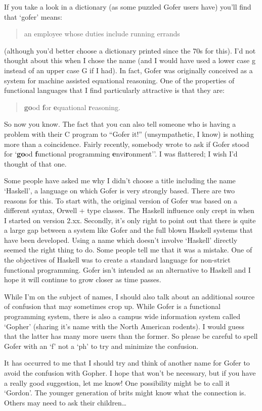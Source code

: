 If you take a look in a dictionary (as some puzzled Gofer users have)
you'll find that `gofer' means:
\begin{quote}
     an employee whose duties include running errands
\end{quote}
(although you'd better choose a dictionary printed since the 70s for
this).  I'd not thought about this when I chose the name (and I would
have used a lower case g instead of an upper case G if I had).  In
fact, Gofer was originally conceived as a system for machine assisted
equational reasoning.  One of the properties of functional languages
that I find particularly attractive is that they are:
\begin{quote}
    {\bf go}od {\bf f}or {\bf e}quational {\bf r}easoning.
\end{quote}
So now you know.  The fact that you can also tell someone who is having
a problem with their C program to ``Gofer it!'' (unsympathetic, I know)
is nothing more than a coincidence.  Fairly recently, somebody wrote to
ask if Gofer stood for 
`{\bf go}od {\bf f}unctional programming {\bf e}nvi{\bf r}onment''. I
was flattered; I wish I'd thought of that one.

Some people have asked me why I didn't choose a title including the
name `Haskell', a language on which Gofer is very strongly based.
There are two reasons for this.  To start with, the original version of
Gofer was based on a different syntax, Orwell + type classes.  The
Haskell influence only crept in when I started on version 2.xx.
Secondly, it's only right to point out that there is quite a large gap
between a system like Gofer and the full blown Haskell systems that
have been developed.  Using a name which doesn't involve `Haskell'
directly seemed the right thing to do.  Some people tell me that it was
a mistake.  One of the objectives of Haskell was to create a standard
language for non-strict functional programming.  Gofer isn't intended
as an alternative to Haskell and I hope it will continue to grow closer
as time passes.

While I'm on the subject of names, I should also talk about an
additional source of confusion that may sometimes crop up.  While Gofer
is a functional programming system, there is also a campus wide
information system called `Gopher' (sharing it's name with the North
American rodents).  I would guess that the latter has many more users
than the former.  So please be careful to spell Gofer with an `f' not
a `ph' to try and minimize the confusion.

It has occurred to me that I should try and think of another name for
Gofer to avoid the confusion with Gopher.  I hope that won't be
necessary, but if you have a really good suggestion, let me know!  One
possibility might be to call it `Gordon'.  The younger generation of
brits might know what the connection is.  Others may need to ask their
children\dots


